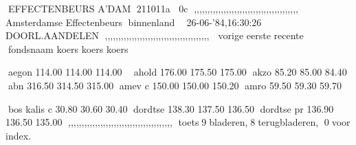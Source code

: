                                         
EFFECTENBEURS A'DAM    211011a    0c
,,,,,,,,,,,,,,,,,,,,,,,,,,,,,,,,,,,,,,,

Amsterdamse Effectenbeurs  binnenland
                                       
26-06-'84,16:30:26       DOORL.AANDELEN
,,,,,,,,,,,,,,,,,,,,,,,,,,,,,,,,,,,,,,,
             vorige   eerste   recente 
fondsnaam    koers    koers    koers   
                                        
aegon        114.00   114.00   114.00  
                                       
ahold        176.00   175.50   175.00  
akzo         85.20    85.00    84.40   
abn          316.50   314.50   315.00  
amev c       150.00   150.00   150.20  
amro         59.50    59.30    59.70   
                                        
bos kalis c  30.80    30.60    30.40   
dordtse      138.30   137.50   136.50  
dordtse pr   136.90   136.50   135.00  
,,,,,,,,,,,,,,,,,,,,,,,,,,,,,,,,,,,,,,,
toets9bladeren,8terugbladeren,     
      0voor index.                    
                                        
